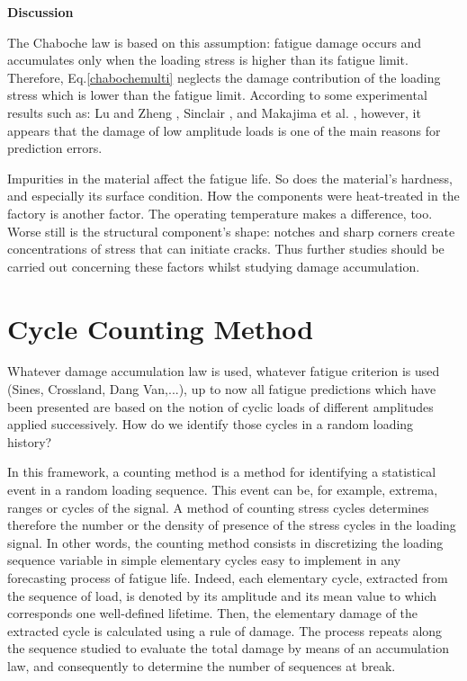 \textbf{Discussion}

The Chaboche law is based on this assumption: fatigue damage occurs and accumulates only when the loading stress is higher than its fatigue limit. Therefore, Eq.\eqref{chabochemulti} neglects the damage contribution of the loading stress which is lower than the fatigue limit. According to some experimental results such as: Lu and Zheng \cite{xi2008strengthening} \cite{xi2009strengthening} \cite{xi2009changes}, Sinclair \cite{sinclair1952investigation}, and Makajima et al. \cite{nakajima2007coaxing}, however, it appears that the damage of low amplitude loads is one
of the main reasons for prediction errors. 

Impurities in the material affect the fatigue life. So does the material's hardness, and especially its surface condition. How the components were heat-treated in the factory is another factor. The operating temperature makes a difference, too. Worse still is the structural component's shape: notches and sharp corners create concentrations of stress that can initiate cracks. Thus further studies should be carried out concerning these factors whilst studying damage accumulation.

\section{Cycle Counting Method}
\label{sec:5.1}
Whatever damage accumulation law is used, whatever fatigue criterion is used (Sines, Crossland, Dang Van,...), up to now all fatigue predictions which have been presented are based on the notion of cyclic loads of different amplitudes applied successively. How do we identify those cycles in a random loading history?

In this framework, a counting method is a method for identifying a statistical event
in a random loading sequence. This event can be, for example, extrema,
ranges or cycles of the signal. A method of counting stress cycles determines
therefore the number or the density of presence of the stress cycles in the loading signal.
In other words, the counting method consists in discretizing the loading sequence
variable in simple elementary cycles easy to implement in any forecasting process
of fatigue life. Indeed, each elementary cycle, extracted from the sequence of
load, is denoted by its amplitude and its mean value to which corresponds one
well-defined lifetime. Then, the elementary damage of the extracted cycle is calculated using
a rule of damage. The process repeats along the sequence studied to evaluate
the total damage by means of an accumulation law, and consequently to determine the number of
sequences at break.

